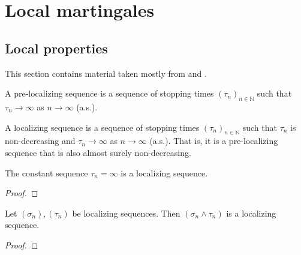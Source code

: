 \chapter{Local martingales}

\section{Local properties}

This section contains material taken mostly from \cite[Chapters 10 and 18]{kallenberg2021} and \cite{almostsuremath}.


\begin{definition}\label{def:preLocalizingSequence}
  \leanok
A pre-localizing sequence is a sequence of stopping times $(\tau_n)_{n \in \mathbb{N}}$ such that $\tau_n \to \infty$ as $n \to \infty$ (a.s.).
\end{definition}


\begin{definition}\label{def:localizingSequence}
  \leanok
A localizing sequence is a sequence of stopping times $(\tau_n)_{n \in \mathbb{N}}$ such that $\tau_n$ is non-decreasing and $\tau_n \to \infty$ as $n \to \infty$ (a.s.).
That is, it is a pre-localizing sequence that is also almost surely non-decreasing.
\end{definition}


\begin{lemma}\label{lem:localizingSequence_const_top}
  \leanok
The constant sequence $\tau_n = \infty$ is a localizing sequence.
\end{lemma}

\begin{proof}\leanok

\end{proof}


\begin{lemma}\label{lem:localizingSequence_min}
  \leanok
Let $(\sigma_n), (\tau_n)$ be localizing sequences.
Then $(\sigma_n \wedge \tau_n)$ is a localizing sequence.
\end{lemma}

\begin{proof}\leanok

\end{proof}


